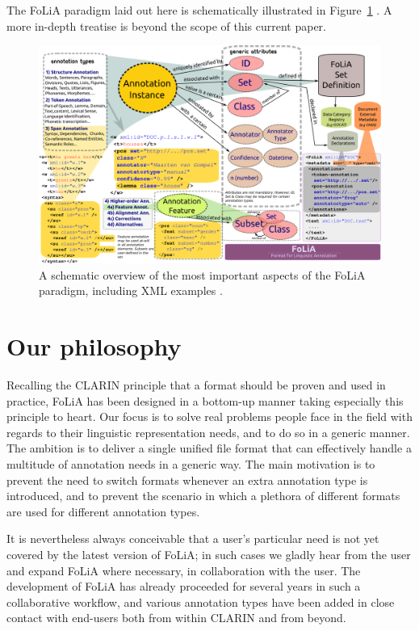 \documentclass[a4paper,11pt]{article}
\begin{document}
The FoLiA paradigm laid out here is schematically illustrated in
Figure~\ref{fig:paradigm} \cite{FOLIADOC2014}. A more in-depth treatise is beyond the scope of this
current paper.

\begin{figure}[h]
\begin{center}
\includegraphics[width=160.0mm]{folia_paradigm.png}
\end{center}
\caption{A schematic overview of the most important aspects of the FoLiA
paradigm, including XML examples \cite{FOLIADOC2014}.}
\label{fig:paradigm}
\end{figure}

\section{Our philosophy}
\label{sec:philosophy}

Recalling the CLARIN principle that a format should be proven and used in
practice, FoLiA has been designed in a bottom-up manner taking especially this
principle to heart. Our focus is to solve real problems people face in the
field with regards to their linguistic representation needs, and to do so in a
generic manner. The ambition is to deliver a single unified file format that
can effectively handle a multitude of annotation needs in a generic way.
The main motivation is to prevent the need to switch formats whenever an extra
annotation type is introduced, and to prevent the scenario in which a plethora
of different formats are used for different annotation types.

It is nevertheless always conceivable that a user's particular need is not yet
covered by the latest version of FoLiA; in such cases we gladly hear from the
user and expand FoLiA where necessary, in collaboration with the user. The
development of FoLiA has already proceeded for several years in such a
collaborative workflow, and various annotation types have been added in close
contact with end-users both from within CLARIN and from beyond.
\end{document}
